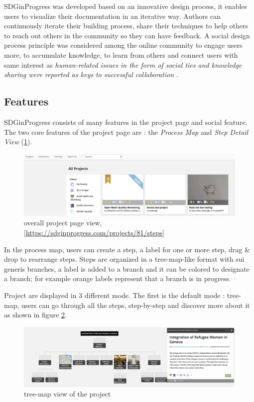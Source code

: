 SDGinProgress was developed based on an innovative design process, it enables users to visualize their documentation in an iterative way. Authors can continuously iterate their building process, share their techniques to help others to reach out others in the community so they can have feedback. A social design process principle was considered among the online community to engage users more, to accumulate knowledge, to learn from others and connect users with same interest as \textit{human-related issues in the form of social ties and knowledge sharing were reported as keys to successful collaboration} \cite{Kotlarsky2005}.

\subsection{Features}\label{sec:feature}
SDGinProgress consists of many features in the project page and social feature. The two core features of the project page are : the \textit{Process Map} and \textit{Step Detail View } (\ref{img-sdginprogressproject}).
\begin{figure}[ht!]
	\centering
	\includegraphics[width=.5\textheight]{./images/img-sdginprogressproject.png}
	\caption{overall project page view, [\url{https://sdginprogress.com/projects/81/steps}]} 
	\label{img-sdginprogressproject}
\end{figure}
In the process map, users can create a step, a label for one or more step, drag \& drop  to rearrange steps. Steps are organized in a tree-map-like format with sui generis branches, a label is added to a branch and it can be colored to designate a branch; for example orange labels represent that a branch is in progress.

Project are displayed in 3 different mode.  The first is the default mode : tree-map, users can go through all the steps, step-by-step and discover more about it as shown in figure \ref{img-viewtreemode1}.
\begin{figure}[H]
	\centering
	\includegraphics[scale=.25]{./images/img-refugeeintegration.png}
	\caption{tree-map view of the project} 
	\label{img-viewtreemode1}
\end{figure}

